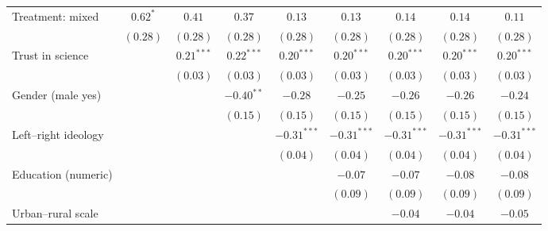 \begin{table}[h]
\begin{center}
\begin{tabular}{l c c c c c c c c}
Treatment: mixed                                                                & $0.62^{*}$  & $0.41$        & $0.37$        & $0.13$        & $0.13$        & $0.14$        & $0.14$        & $0.11$        \\
                                                                                & $(0.28)$    & $(0.28)$      & $(0.28)$      & $(0.28)$      & $(0.28)$      & $(0.28)$      & $(0.28)$      & $(0.28)$      \\
Trust in science                                                                &             & $0.21^{***}$  & $0.22^{***}$  & $0.20^{***}$  & $0.20^{***}$  & $0.20^{***}$  & $0.20^{***}$  & $0.20^{***}$  \\
                                                                                &             & $(0.03)$      & $(0.03)$      & $(0.03)$      & $(0.03)$      & $(0.03)$      & $(0.03)$      & $(0.03)$      \\
Gender (male yes)                                                               &             &               & $-0.40^{**}$  & $-0.28$       & $-0.25$       & $-0.26$       & $-0.26$       & $-0.24$       \\
                                                                                &             &               & $(0.15)$      & $(0.15)$      & $(0.15)$      & $(0.15)$      & $(0.15)$      & $(0.15)$      \\
Left–right ideology                                                             &             &               &               & $-0.31^{***}$ & $-0.31^{***}$ & $-0.31^{***}$ & $-0.31^{***}$ & $-0.31^{***}$ \\
                                                                                &             &               &               & $(0.04)$      & $(0.04)$      & $(0.04)$      & $(0.04)$      & $(0.04)$      \\
Education (numeric)                                                             &             &               &               &               & $-0.07$       & $-0.07$       & $-0.08$       & $-0.08$       \\
                                                                                &             &               &               &               & $(0.09)$      & $(0.09)$      & $(0.09)$      & $(0.09)$      \\
Urban–rural scale                                                               &             &               &               &               &               & $-0.04$       & $-0.04$       & $-0.05$       \\

\end{tabular}
\end{center}
\end{table}

